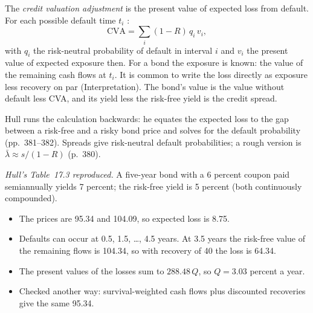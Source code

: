 \begin{qfmethod}\label{meth:risky-bond-cva}
 The \emph{credit valuation adjustment} is the present value of expected loss from default. For each possible default time $t_i$ \citep[pp.~395--396]{risk-management-financial-institutions-2023}:
\[ \mathrm{CVA}=\sum_i(1-R)\,q_i\,v_i, \]
with $q_i$ the risk-neutral probability of default in interval $i$ and $v_i$ the present value of expected exposure then. For a bond the exposure is known: the value of the remaining cash flows at $t_i$. It is common to write the loss directly as exposure less recovery on par (Interpretation). The bond's value is the value without default less CVA, and its yield less the risk-free yield is the credit spread.

Hull runs the calculation backwards: he equates the expected loss to the gap between a risk-free and a risky bond price and solves for the default probability (pp.~381--382). Spreads give risk-neutral default probabilities; a rough version is $\bar\lambda\approx s/(1-R)$ (p.~380).

 \emph{Hull's Table~17.3 reproduced.} A five-year bond with a 6 percent coupon paid semiannually yields 7 percent; the risk-free yield is 5 percent (both continuously compounded).
\begin{itemize}
\item The prices are 95.34 and 104.09, so expected loss is 8.75.
\item Defaults can occur at 0.5, 1.5, \dots, 4.5 years. At 3.5 years the risk-free value of the remaining flows is 104.34, so with recovery of 40 the loss is 64.34.
\item The present values of the losses sum to $288.48\,Q$, so $Q=3.03$ percent a year.
\item Checked another way: survival-weighted cash flows plus discounted recoveries give the same 95.34.
\end{itemize}


\end{qfmethod}
